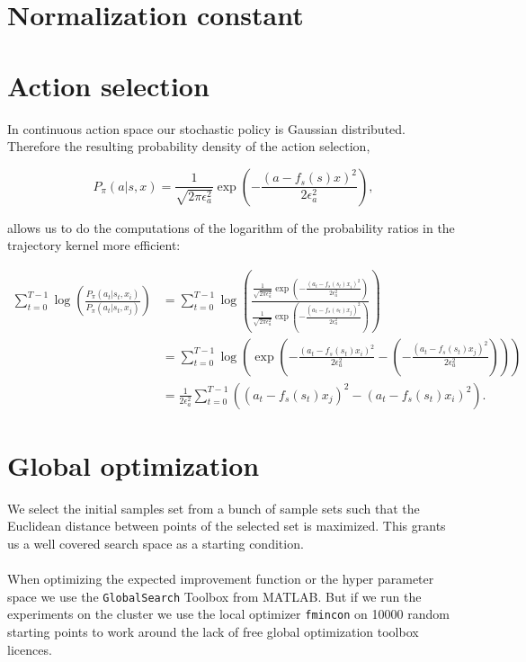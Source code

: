 \section{Normalization constant}

\section{Action selection}

In continuous action space our stochastic policy is Gaussian distributed. Therefore the resulting probability density of the action selection,

$$P_{\pi}(a|s,x) = \frac{1}{\sqrt{2\pi\epsilon_a^2}}\exp\left(-\frac{(a-f_s(s)x)^2}{2\epsilon_a^2}\right),$$

allows us to do the computations of the logarithm of the probability ratios in the trajectory kernel more efficient:

\begin{align*}
    \sum_{t=0}^{T-1} \log \left(\frac{P_{\pi}(a_{t}|s_{t},x_i)}{P_{\pi}(a_{t}|s_{t},x_j)}\right) &= \sum_{t=0}^{T-1} \log \left(\frac{\frac{1}{\sqrt{2\pi\epsilon_a^2}}\exp\left(-\frac{(a_t-f_s(s_t)x_i)^2}{2\epsilon_a^2}\right)}{\frac{1}{\sqrt{2\pi\epsilon_a^2}}\exp\left(-\frac{(a_t-f_s(s_t)x_j)^2}{2\epsilon_a^2}\right)}\right)\\
    &= \sum_{t=0}^{T-1} \log \left( \exp \left( -\frac{(a_t-f_s(s_t)x_i)^2}{2\epsilon_a^2} - \left(-\frac{(a_t-f_s(s_t)x_j)^2}{2\epsilon_a^2}\right)\right)\right)\\
    &= \frac{1}{2\epsilon_a^2} \sum_{t=0}^{T-1} \left((a_t-f_s(s_t)x_j)^2 - (a_t-f_s(s_t)x_i)^2\right).
\end{align*}




\section{Global optimization}
We select the initial samples set from a bunch of sample sets such that the Euclidean distance between points of the selected set is maximized. This grants us a well covered search space as a starting condition.
\\\\
When optimizing the expected improvement function or the hyper parameter space we use the \texttt{GlobalSearch} Toolbox from MATLAB. But if we run the experiments on the cluster we use the local optimizer \texttt{fmincon} on 10000 random starting points to work around the lack of free global optimization toolbox licences.

